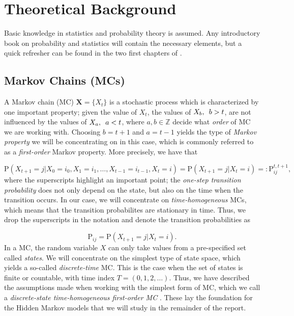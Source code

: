 \documentclass{article}\usepackage[]{graphicx}\usepackage[]{color}
\begin{document}
\section{Theoretical Background}

Basic knowledge in statistics and probability theory is assumed. Any introductory book on probability and statistics will contain the necessary elements, but a quick refresher can be found in the two first chapters of \cite{Pinsky2011}.

\subsection{Markov Chains (MCs)}
A Markov chain (MC) $\mathbf{X} = \{X_t\}$ is a stochastic process which is characterized by one important property; given the value of $X_t$, the values of $X_b, \hspace{0.5em} b > t$, are not influenced by the values of $X_a, \hspace{0.5em} a < t$, where $a,b \in \mathbb{Z}$ decide what \textit{order} of MC we are working with. Choosing $b = t+1$ and $a = t-1$ yields the type of \textit{Markov property} we will be concentrating on in this case, which is commonly referred to as a \textit{first-order} Markov property. More precisely, we have that 

\begin{equation*}
     \text{P}(X_{t+1} = j|X_0 = i_0, X_1 = i_1, \ldots, X_{t-1} = i_{t-1}, X_t = i) = \text{P}(X_{t+1} = j|X_t = i) =: \text{P}_{ij}^{t, t+1}, 
\end{equation*}
where the superscripts highlight an important point; the \textit{one-step transition probability} does not only depend on the state, but also on the time when the transition occurs. In our case, we will concentrate on \textit{time-homogeneous} MCs, which means that the transition probabilites are stationary in time. Thus, we drop the superscripts in the notation and denote the transition probabilities as 

\begin{equation*}
    \text{P}_{ij} = \text{P}(X_{t+1} = j|X_t = i).
\end{equation*}
In a MC, the random variable $X$ can only take values from a pre-specified set called \textit{states}. We will concentrate on the simplest type of state space, which yields a so-called \textit{discrete-time} MC. This is the case when the set of states is finite or countable, with time index $T = (0,1,2,\ldots)$. Thus, we have described the assumptions made when working with the simplest form of MC, which we call a \textit{discrete-state time-homogeneous first-order MC} \cite{Pinsky2011}. These lay the foundation for the Hidden Markov models that we will study in the remainder of the report. 
\end{document}
